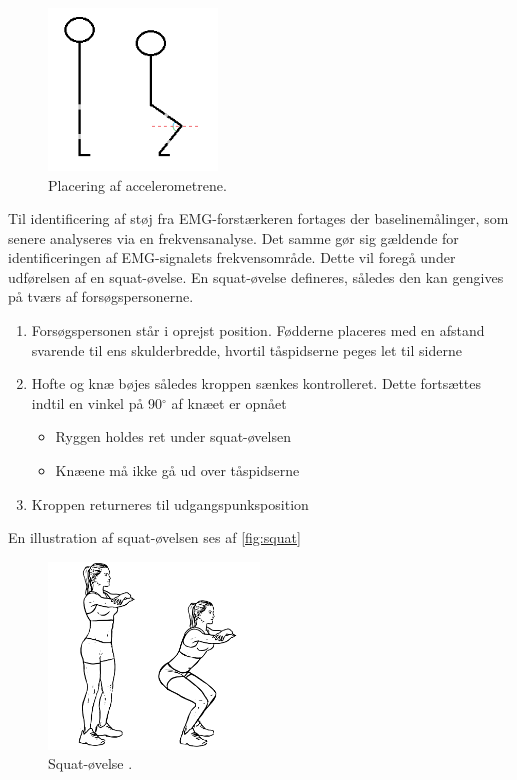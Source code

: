 \begin{figure}[H]
\centering
\includegraphics[width=0.4\textwidth]{figures/accelerometervinkel.png}
\caption{Placering af accelerometrene.}
\label{fig:accelerometervinkel}
\end{figure}

Til identificering af støj fra EMG-forstærkeren fortages der baselinemålinger, som senere analyseres via en frekvensanalyse. Det samme gør sig gældende for identificeringen af EMG-signalets frekvensområde. Dette vil foregå under udførelsen af en squat-øvelse.
En squat-øvelse defineres, således den kan gengives på tværs af forsøgspersonerne.\vspace{3mm}
\begin{enumerate}
\item Forsøgspersonen står i oprejst position. Fødderne placeres med en afstand svarende til ens skulderbredde, hvortil tåspidserne peges let til siderne
\item Hofte og knæ bøjes således kroppen sænkes kontrolleret. Dette fortsættes indtil en vinkel på 90$^{\circ}$ af knæet er opnået
	\begin{itemize}
	\item Ryggen holdes ret under squat-øvelsen 
	\item Knæene må ikke gå ud over tåspidserne 
	\end{itemize}
\item Kroppen returneres til udgangspunksposition
\end{enumerate} \vspace{3mm}
En illustration af squat-øvelsen ses af \autoref{fig:squat}

\begin{figure}[H]
\centering
\includegraphics[width=0.5\textwidth]{figures/squat.png}
\caption{Squat-øvelse \citep{squat2015}.}
\label{fig:squat}
\end{figure}

